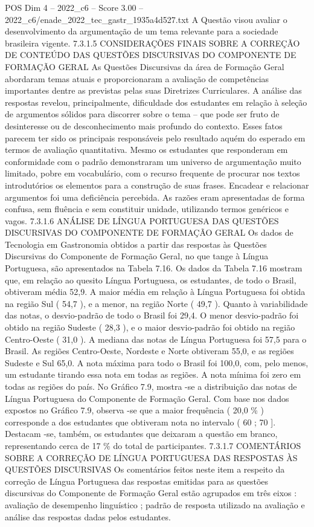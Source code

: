 \begin{textsample}{POS Dim 4 – 2022\_c6 – Score 3.00 – 2022\_c6/enade\_2022\_tec\_gastr\_1935a4d527.txt}
A Questão visou avaliar o desenvolvimento da argumentação de um tema relevante para a sociedade brasileira vigente. 7.3.1.5 CONSIDERAÇÕES FINAIS SOBRE A CORREÇÃO DE CONTEÚDO DAS QUESTÕES DISCURSIVAS DO COMPONENTE DE FORMAÇÃO GERAL As Questões Discursivas da área de Formação Geral abordaram temas atuais e proporcionaram a avaliação de competências importantes dentre as previstas pelas suas Diretrizes Curriculares.
A análise das respostas revelou, principalmente, dificuldade dos estudantes em relação à seleção de argumentos sólidos para discorrer sobre o tema – que pode ser fruto de desinteresse ou de desconhecimento mais profundo do contexto.
Esses fatos parecem ter sido os principais responsáveis pelo resultado aquém do esperado em termos de avaliação quantitativa.
Mesmo os estudantes que responderam em conformidade com o padrão demonstraram um universo de argumentação muito limitado, pobre em vocabulário, com o recurso frequente de procurar nos textos introdutórios os elementos para a construção de suas frases.
Encadear e relacionar argumentos foi uma deficiência percebida.
As razões eram apresentadas de forma confusa, sem fluência e sem constituir unidade, utilizando termos genéricos e vagos. 7.3.1.6 ANÁLISE DE LÍNGUA PORTUGUESA DAS QUESTÕES DISCURSIVAS DO COMPONENTE DE FORMAÇÃO GERAL Os dados de Tecnologia em Gastronomia obtidos a partir das respostas às Questões Discursivas do Componente de Formação Geral, no que tange à Língua Portuguesa, são apresentados na Tabela 7.16.
Os dados da Tabela 7.16 mostram que, em relação ao quesito Língua Portuguesa, os estudantes, de todo o Brasil, obtiveram média 52,9.
A maior média em relação à Língua Portuguesa foi obtida na região Sul ( 54,7 ), e a menor, na região Norte ( 49,7 ).
Quanto à variabilidade das notas, o desvio-padrão de todo o Brasil foi 29,4.
O menor desvio-padrão foi obtido na região Sudeste ( 28,3 ), e o maior desvio-padrão foi obtido na região Centro-Oeste ( 31,0 ).
A mediana das notas de Língua Portuguesa foi 57,5 para o Brasil.
As regiões Centro-Oeste, Nordeste e Norte obtiveram 55,0, e as regiões Sudeste e Sul 65,0.
A nota máxima para todo o Brasil foi 100,0, com, pelo menos, um estudante tirando essa nota em todas as regiões.
A nota mínima foi zero em todas as regiões do país.
No Gráfico 7.9, mostra -se a distribuição das notas de Língua Portuguesa do Componente de Formação Geral.
Com base nos dados expostos no Gráfico 7.9, observa -se que a maior frequência ( 20,0 \% ) corresponde a dos estudantes que obtiveram nota no intervalo ( 60 ; 70 ].
Destacam -se, também, os estudantes que deixaram a questão em branco, representando cerca de 17 \% do total de participantes. 7.3.1.7 COMENTÁRIOS SOBRE A CORREÇÃO DE LÍNGUA PORTUGUESA DAS RESPOSTAS ÀS QUESTÕES DISCURSIVAS Os comentários feitos neste item a respeito da correção de Língua Portuguesa das respostas emitidas para as questões discursivas do Componente de Formação Geral estão agrupados em três eixos : avaliação de desempenho linguístico ; padrão de resposta utilizado na avaliação e análise das respostas dadas pelos estudantes.

\end{textsample}
